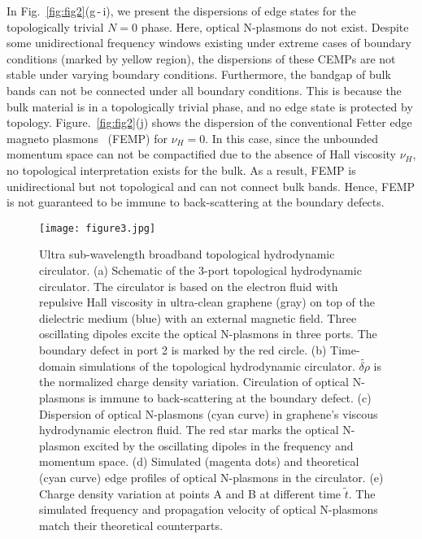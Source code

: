 \documentclass[%
reprint,
amsmath,amssymb,
aps,superscriptaddress
]{revtex4-2}
\begin{document}
In Fig.~\ref{fig:fig2}(g\,-\,i), we present the dispersions of edge states for the topologically trivial $N=0$ phase. Here, optical N-plasmons do not exist. Despite some unidirectional frequency windows existing under extreme cases of boundary conditions (marked by yellow region), the dispersions of these CEMPs are not stable under varying boundary conditions. Furthermore, the bandgap of bulk bands can not be connected under all boundary conditions. This is because the bulk material is in a topologically trivial phase, and no edge state is protected by topology. Figure.~\ref{fig:fig2}(j) shows the dispersion of the conventional Fetter edge magneto plasmons~\cite{fetter1985edge} (FEMP) for $\nu_H=0$. In this case, since the unbounded momentum space can not be compactified due to the absence of Hall viscosity $\nu_H$, no topological interpretation exists for the bulk. As a result, FEMP is unidirectional but not topological and can not connect bulk bands. Hence, FEMP is not guaranteed to be immune to back-scattering at the boundary defects.

\begin{figure*}
    \centering
    \texttt{[image: figure3.jpg]}
    \caption{Ultra sub-wavelength broadband topological hydrodynamic circulator. (a) Schematic of the 3-port topological hydrodynamic circulator. The circulator is based on the electron fluid with repulsive Hall viscosity in ultra-clean graphene (gray) on top of the dielectric medium (blue) with an external magnetic field. Three oscillating dipoles excite the optical N-plasmons in three ports. The boundary defect in port 2 is marked by the red circle.  (b) Time-domain simulations of the topological hydrodynamic circulator. $\widetilde{\delta \rho}$ is the normalized charge density variation. Circulation of optical N-plasmons is immune to back-scattering at the boundary defect. (c) Dispersion of optical N-plasmons (cyan curve) in graphene's viscous hydrodynamic electron fluid. The red star marks the optical N-plasmon excited by the oscillating dipoles in the frequency and momentum space. (d) Simulated (magenta dots) and theoretical (cyan curve) edge profiles of optical N-plasmons in the circulator. (e) Charge density variation at points A and B at different time $\tilde{t}$. The simulated frequency and propagation velocity of optical N-plasmons match their theoretical counterparts.}
    \label{fig:fig3}
\end{figure*}
\end{document}
